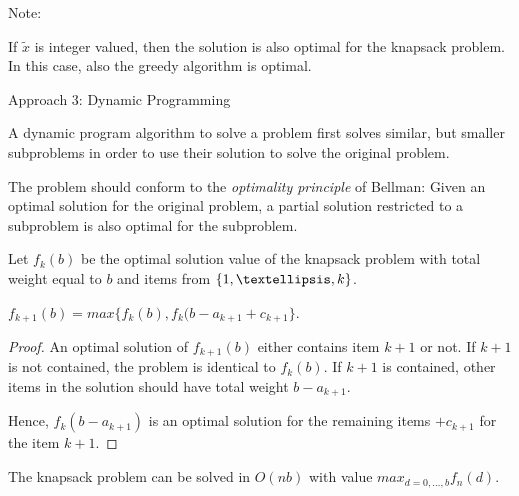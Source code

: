 Note:

If $\tilde{x}$ is integer valued, then the solution is also optimal for the
knapsack problem. In this case, also the greedy algorithm is optimal.

Approach 3: Dynamic Programming

A dynamic program algorithm to solve a problem first solves similar, but
smaller subproblems in order to use their solution to solve the original
problem.

The problem should conform to the \emph{optimality principle} of Bellman:
Given an optimal solution for the original problem, a partial solution
restricted to a subproblem is also optimal for the subproblem.

Let $f_k(b)$ be the optimal solution value of the knapsack problem with
total weight equal to $b$ and items from $\ouptoset{k}$.

\begin{thm}
$f_{k+1}(b) = max \{ f_k(b), f_k(b-a_{k+1} + c_{k+1} \}$.
\end{thm}
\begin{proof}
An optimal solution of $f_{k+1}(b)$ either contains item $k+1$ or not.
If $k+1$ is not contained, the problem is identical to $f_k(b)$.
If $k+1$ is contained, other items in the solution should have total weight
$b - a_{k+1}$.

Hence, $f_k(b - a_{k+1})$ is an optimal solution for the remaining items $+
c_{k+1}$ for the item $k+1$.
\end{proof}

\begin{cor}
The knapsack problem can be solved in $O(nb)$ with value $max_{d=0, ..., b}
f_n(d)$.
\end{cor}
